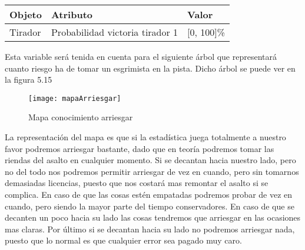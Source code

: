 \begin{table}[]
  \centering
  \caption{}
  \label{tab:Tabla objeto atributo y valor}
  \begin{tabular}{lll}
    Objeto & Atributo & Valor \\ \hline
    \multicolumn{1}{l|}{Tirador} & Probabilidad victoria tirador 1 & [0, 100]\%
  \end{tabular}
\end{table}

Esta variable será tenida en cuenta para el siguiente árbol que representará
cuanto riesgo ha de tomar un esgrimista en la pista. Dicho árbol se puede
ver en la figura 5.15

\begin{figure}[htb]
  \centering
    \texttt{[image: mapaArriesgar]}
  \caption[Mapa conocimiento arriesgar]{Mapa conocimiento arriesgar}
  \label{fig:Mapa conocimiento arriesgar}
\end{figure}

La representación del mapa es que si la estadística juega totalmente a nuestro favor
podremos arriesgar bastante, dado que en teoría podremos tomar las riendas del asalto
en cualquier momento. Si se decantan hacia nuestro lado, pero no del todo nos podremos
permitir arriesgar de vez en cuando, pero sin tomarnos demasiadas licencias, puesto que
nos costará mas remontar el asalto si se complica. En caso de que las cosas estén empatadas
podremos probar de vez en cuando, pero siendo la mayor parte del tiempo conservadores. En
caso de que se decanten un poco hacia su lado las cosas tendremos que arriesgar en las ocasiones
mas claras. Por último si se decantan hacia su lado no podremos arriesgar nada, puesto que lo normal
es que cualquier error sea pagado muy caro.
